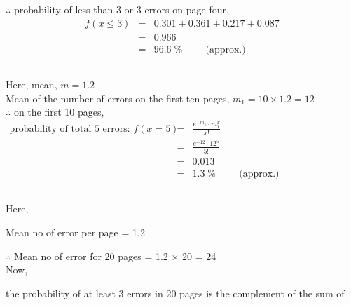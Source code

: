\documentclass{article}
\begin{document}
{    \hspace{1.5em}$\therefore$ probability of less than 3 or 3 errors on page four,
    \begin{eqnarray*}
        f(x \leq 3) &=& 0.301 + 0.361 + 0.217 + 0.087\\
        &=& 0.966\\
        &=& 96.6\;\%\hspace{1cm}\text{(approx.)}
    \end{eqnarray*}

    \newpage
    \subsection{} Here, mean, $m = 1.2$\\

    \hspace{1.5em}Mean of the number of errors on the first ten pages, $m_1 = 10 \times 1.2 = 12$\\

    \hspace{1.5em}$\therefore$ on the first 10 pages,\\
    \begin{eqnarray*}
        \text{probability of total 5 errors: } f(x=5) &=& \frac{e^{-m_1}\cdot m_1^x}{x!}\\
        &=& \frac{e^{-12}\cdot 12^5}{5!}\\
        &=& 0.013\hspace{6cm}\\
        &=& 1.3\;\% \hspace{1cm}\text{(approx.)}
    \end{eqnarray*}

    \subsection{} Here,

    \hspace{1.5em} Mean no of error per page = 1.2

    \hspace{1.5em} $\therefore$ Mean no of error for 20 pages = 1.2 $\times$ 20 = 24
    \\

    \hspace{1.5em}Now,

    \hspace{1.5em}the probability of at least 3 errors in 20 pages is the complement of the sum of

}
\end{document}
